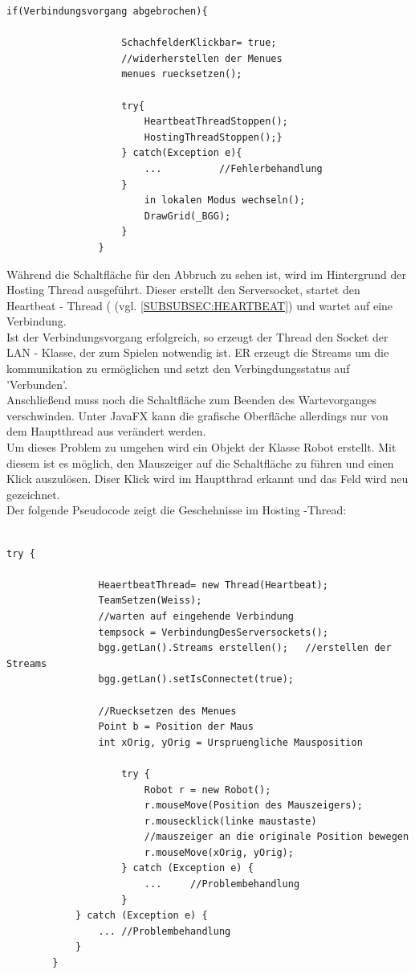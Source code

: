 \documentclass[12pt,a4paper]{article}
\begin{document}
{\begin{lstlisting}
if(Verbindungsvorgang abgebrochen){

					SchachfelderKlickbar= true; 
					//widerherstellen der Menues
					menues ruecksetzen();		
						
					try{	
						HeartbeatThreadStoppen();
						HostingThreadStoppen();}
					} catch(Exception e){
						...			 //Fehlerbehandlung
					}
						in lokalen Modus wechseln();
						DrawGrid(_BGG);
					}
				}

\end{lstlisting}

Während die Schaltfläche für den Abbruch zu sehen ist, wird im Hintergrund der Hosting Thread ausgeführt. Dieser erstellt den Serversocket, startet den Heartbeat - Thread (  (vgl. \ref{SUBSUBSEC:HEARTBEAT}) und wartet auf eine Verbindung. \\[2ex]
Ist der Verbindungsvorgang erfolgreich, so erzeugt der Thread den Socket der LAN - Klasse, der zum Spielen notwendig ist. ER erzeugt die Streams um die kommunikation zu ermöglichen und setzt den Verbingdungsstatus auf 'Verbunden'. \\
Anschließend muss noch die Schaltfläche zum Beenden des Wartevorganges verschwinden. Unter JavaFX kann die grafische Oberfläche allerdings nur von dem Hauptthread aus verändert werden.\\ Um dieses Problem zu umgehen wird ein Objekt der Klasse Robot erstellt. Mit diesem ist es möglich, den Mauszeiger auf die Schaltfläche zu führen und einen Klick auszulösen. 
Diser Klick wird im Hauptthrad erkannt und das Feld wird neu gezeichnet. \\
Der folgende Pseudocode zeigt die Geschehnisse im Hosting -Thread:\\
\lstset{language=java}
\begin{lstlisting}

try {
				
				HeaertbeatThread= new Thread(Heartbeat);
				TeamSetzen(Weiss);
				//warten auf eingehende Verbindung
				tempsock = VerbindungDesServersockets();
				bgg.getLan().Streams erstellen();	//erstellen der Streams
				bgg.getLan().setIsConnectet(true);
				
				//Ruecksetzen des Menues
				Point b = Position der Maus
				int xOrig, yOrig = Urspruengliche Mausposition
		      
		            try {
		                Robot r = new Robot();
		                r.mouseMove(Position des Mauszeigers);
		                r.mousecklick(linke maustaste)
		                //mauszeiger an die originale Position bewegen
		                r.mouseMove(xOrig, yOrig);
		            } catch (Exception e) {
		                ...  	//Problembehandlung
		            }
			} catch (Exception e) {
				...	//Problembehandlung
			}		
		}


\end{lstlisting}}
\end{document}
